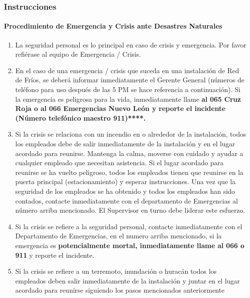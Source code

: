 \subsubsection{Instrucciones}
\paragraph{Procedimiento de Emergencia y Crisis ante Desastres Naturales}
\begin{enumerate}
	\item La seguridad personal es lo principal en caso de crisis y emergencia. Por favor refiérase al equipo de Emergencia / Crisis.
	\item En el caso de una emergencia / crisis que suceda en una instalación de Red de Fríos, se deberá informar inmediatamente el Gerente General (números de teléfono para uso después de las 5 PM se hace referencia a continuación). Si la emergencia es peligrosa para la vida, inmediatamente llame \textbf{al 065 Cruz Roja o al 066 Emergencias Nuevo León y reporte el incidente (Número telefónico maestro 911)****.}
	\item Si la crisis se relaciona con un incendio en o alrededor de la instalación, todos los empleados debe de salir inmediatamente de la instalación y en el lugar acordado para reunirse. Mantenga la calma, moverse con cuidado y ayudar a cualquier empleado que necesitan asistencia. Si el lugar acordado para reunirse se ha vuelto peligroso, todos los empleados tienen que reunirse en la puerta principal (estacionamiento) y esperar instrucciones. Una vez que la seguridad de los empleados se ha obtenido y todos los empleados han sido contados, contacte inmediatamente con el departamento de Emergencias al número arriba mencionado. El Supervisor en turno debe liderar este esfuerzo.
	\item Si la crisis se refiere a la seguridad personal, contacte inmediatamente con el Departamento de Emergencias, en el numero arriba mencionado, si la emergencia es \textbf{potencialmente mortal, inmediatamente llame al 066 o 911} y reporte el incidente.
	\item Si la crisis se refiere a un terremoto, inundación o huracán todos los empleados deben salir inmediatamente de la instalación y juntar en el lugar acordado para reunirse siguiendo los pasos mencionados anteriormente
\end{enumerate}

